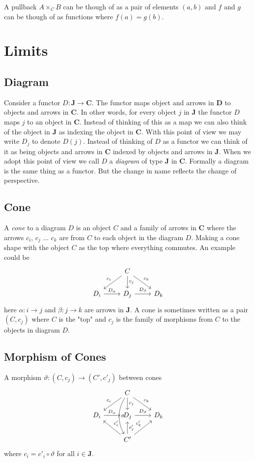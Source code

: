 \documentclass{book}
\theoremstyle{definition}
\begin{document}
A pullback $A \times_{C} B$ can be though of as a pair of elements $(a, b)$ and
$f$ and $g$ can be though of as functions where $f(a) = g(b)$.

\section{Limits}




\subsection{Diagram}

Consider a functor $D : \textbf{J} \to \textbf{C}$. The functor maps object and
arrows in \textbf{D} to objects and arrows in \textbf{C}. In other words, for
every object $j$ in \textbf{J} the functor $D$ maps $j$ to an object in
\textbf{C}. Instead of thinking of this as a map we can also think of the object
in \textbf{J} as indexing the object in \textbf{C}. With this point of view we
may write $D_{j}$ to denote $D(j)$. Instead of thinking of $D$ as a functor we
can think of it as being objects and arrows in \textbf{C} indexed by objects and
arrows in \textbf{J}. When we adopt this point of view we call $D$ a
\emph{diagram} of type \textbf{J} in \textbf{C}. Formally a diagram is the same
thing as a functor. But the change in name reflects the change of perspective.

\subsection{Cone} A \emph{cone} to a diagram $D$ is an object $C$ and a family
of arrows in \textbf{C} where the arrows $c_i$, $c_j$ ... $c_k$ are from $C$ to
each object in the diagram $D$. Making a cone shape with the object $C$ as the
top where everything commutes. An example could be
\[
\begin{tikzcd}
  & C \arrow[dl, "c_i"'] \arrow[d, "c_j"] \arrow[dr, "c_k"]  \\
  D_i \arrow[r,"D_\alpha"] & D_j \arrow[r, "D_\beta"]  & D_k
\end{tikzcd}
\]
here $\alpha : i \to j$ and $\beta : j \to k$ are arrows in \textbf{J}. A cone
is sometimes
written as a pair $(C, c_j)$ where $C$ is the "top" and $c_j$ is the family of
morphisms from $C$ to the objects in diagram $D$.

\subsection{Morphism of Cones}
A morphism $\vartheta : (C, c_j) \to (C', c'_j)$ between cones
\[
\begin{tikzcd}
  & C \arrow[dl, "c_i"'] \arrow[d, "c_j"] \arrow[dr, "c_k"] \arrow[dd, "\vartheta", bend right] \\
  D_i \arrow[r,"D_\alpha"] & D_j \arrow[r, "D_\beta"]  & D_k \\
  & C' \arrow[ul, "c'_i"'] \arrow[u, "c'_j"'] \arrow[ur, "c'_k"]
\end{tikzcd}
\]
where $c_i = c'_i \circ \vartheta$ for all $i \in \textbf{J}$.
\end{document}
